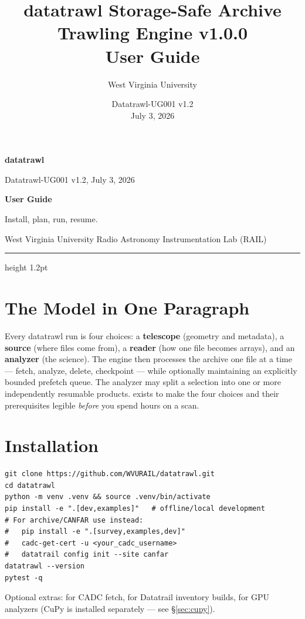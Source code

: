 \documentclass[10pt,letterpaper]{article}
\title{datatrawl Storage-Safe Archive Trawling Engine v1.0.0\\User Guide}
\author{West Virginia University}
\date{Datatrawl-UG001 v1.2 \\ July 3, 2026}
\newcommand{\code}[1]{\texttt{\detokenize{#1}}}
\begin{document}
\thispagestyle{fancy}
{\sffamily
\begin{minipage}[t]{0.39\textwidth}
  {\fontsize{24}{26}\selectfont\bfseries\color{TrawlAmber}datatrawl}\par
  {\small Datatrawl-UG001 v1.2, July 3, 2026}
\end{minipage}%
\begin{minipage}[t]{0.61\textwidth}
  \raggedleft
  {\large\bfseries User Guide}\par
  {\small Install, plan, run, resume.}\par
  {\small West Virginia University Radio Astronomy Instrumentation Lab (RAIL)}
\end{minipage}
}
\vspace{6pt}
{\color{TrawlAmber}\hrule height 1.2pt}
\vspace{8pt}

\section{The Model in One Paragraph}
Every datatrawl run is four choices: a \textbf{telescope} (geometry and
metadata), a \textbf{source} (where files come from), a \textbf{reader} (how
one file becomes arrays), and an \textbf{analyzer} (the science). The engine
then processes the archive one file at a time --- fetch, analyze, delete,
checkpoint --- while optionally maintaining an explicitly bounded prefetch
queue. The analyzer may split a selection into one or more independently
resumable products. \code{datatrawl doctor} exists to make the four choices
and their prerequisites legible \emph{before} you spend hours on a scan.

\section{Installation}
\begin{lstlisting}
git clone https://github.com/WVURAIL/datatrawl.git
cd datatrawl
python -m venv .venv && source .venv/bin/activate
pip install -e ".[dev,examples]"   # offline/local development
# For archive/CANFAR use instead:
#   pip install -e ".[survey,examples,dev]"
#   cadc-get-cert -u <your_cadc_username>
#   datatrail config init --site canfar
datatrawl --version
pytest -q
\end{lstlisting}
Optional extras: \code{[cadc]} for CADC fetch, \code{[survey]} for Datatrail
inventory builds, \code{[gpu]} for GPU analyzers (CuPy is installed separately
--- see \S\ref{sec:cupy}).
\end{document}
